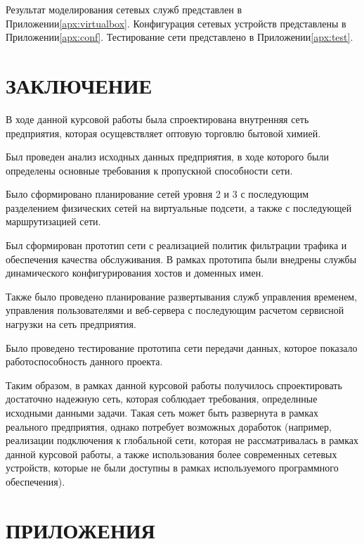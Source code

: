 \documentclass[14pt, a4paper]{extarticle}
\begin{document}
Результат моделирования сетевых служб представлен в
Приложении\;\ref{apx:virtualbox}. Конфигурация сетевых устройств
представлены в Приложении\;\ref{apx:conf}. Тестирование сети
представлено в Приложении\;\ref{apx:test}.

\clearpage
\section*{ЗАКЛЮЧЕНИЕ}

В ходе данной курсовой работы была спроектирована внутренняя сеть
предприятия, которая осущевствляет оптовую торговлю бытовой химией.

Был проведен анализ исходных данных предприятия, в ходе которого были
определены основные требования к пропускной способности сети.

Было сформировано планирование сетей уровня 2 и 3 с последующим
разделением физических сетей на виртуальные подсети, а также с
последующей маршрутизацией сети.

Был сформирован прототип сети с реализацией политик фильтрации трафика
и обеспечения качества обслуживания. В рамках прототипа были внедрены
службы динамического конфигурирования хостов и доменных имен.

Также было проведено планирование развертывания служб управления
временем, управления пользователями и веб-сервера с последующим
расчетом сервисной нагрузки на сеть предприятия.

Было проведено тестирование прототипа сети передачи данных, которое
показало работоспособность данного проекта.

Таким образом, в рамках данной курсовой работы получилось
спроектировать достаточно надежную сеть, которая соблюдает требования,
определнные исходными данными задачи. Такая сеть может быть развернута
в рамках реального предприятия, однако потребует возможных доработок
(например, реализации подключения к глобальной сети, которая не
рассматривалась в рамках данной курсовой работы, а также использования
более современных сетевых устройств, которые не были доступны в рамках
используемого программного обеспечения).

\begingroup \let\itshape\upshape \sloppy
\printbibliography[title=СПИСОК ИСПОЛЬЗУЕМЫХ ИСТОЧНИКОВ]
\endgroup

\clearpage
\section*{ПРИЛОЖЕНИЯ}
\end{document}
